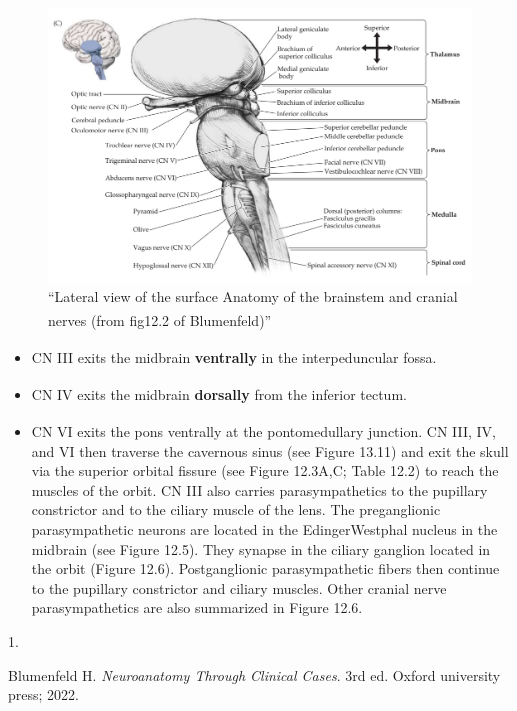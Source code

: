 \documentclass[
  letterpaper,
  DIV=11,
  numbers=noendperiod]{scrartcl}
\providecommand{\tightlist}{%
  \setlength{\itemsep}{0pt}\setlength{\parskip}{0pt}}\usepackage{longtable,booktabs,array}
\newlength{\cslhangindent}
\newlength{\csllabelwidth}
\newenvironment{CSLReferences}[2] %
 {\begin{list}{}{%
  \setlength{\itemindent}{0pt}
  \setlength{\leftmargin}{0pt}
  \setlength{\parsep}{0pt}
  \ifodd #1
   \setlength{\leftmargin}{\cslhangindent}
   \setlength{\itemindent}{-1\cslhangindent}
  \fi
  \setlength{\itemsep}{#2\baselineskip}}}
 {\end{list}}
\newcommand{\CSLLeftMargin}[1]{\parbox[t]{\csllabelwidth}{\strut#1\strut}}
\newcommand{\CSLRightInline}[1]{\parbox[t]{\linewidth - \csllabelwidth}{\strut#1\strut}}
\begin{document}
\begin{figure}[H]

{\centering \includegraphics{../../../../../../Alchemy Archive/Neuro/Neuroanatomy/Cranial Nerves/images/fig12.2C Surface anatomy of the brainstem and cranial nerves blumenfield2022.png}

}

\caption{``Lateral view of the surface Anatomy of the brainstem and
cranial nerves (from fig12.2 of
Blumenfeld\textsuperscript{})''}

\end{figure}%

\begin{itemize}
\tightlist
\item
  CN III exits the midbrain \textbf{ventrally} in the interpeduncular
  fossa\textsuperscript{}.
\item
  CN IV exits the midbrain \textbf{dorsally} from the inferior
  tectum\textsuperscript{}.
\item
  CN VI exits the pons ventrally at the pontomedullary
  junction\textsuperscript{}.
  CN III, IV, and VI then traverse the cavernous sinus (see Figure
  13.11) and exit the skull via the superior orbital fissure (see Figure
  12.3A,C; Table 12.2) to reach the muscles of the orbit. CN III also
  carries parasympathetics to the pupillary constrictor and to the
  ciliary muscle of the lens. The preganglionic parasympathetic neurons
  are located in the EdingerWestphal nucleus in the midbrain (see Figure
  12.5). They synapse in the ciliary ganglion located in the orbit
  (Figure 12.6). Postganglionic parasympathetic fibers then continue to
  the pupillary constrictor and ciliary muscles. Other cranial nerve
  parasympathetics are also summarized in Figure 12.6.
\end{itemize}

\label{refs}
\begin{CSLReferences}{0}{1}
\CSLLeftMargin{1. }%
\CSLRightInline{Blumenfeld H. \emph{Neuroanatomy Through Clinical
Cases}. 3rd ed. {Oxford university press}; 2022.}

\end{CSLReferences}
\end{document}
